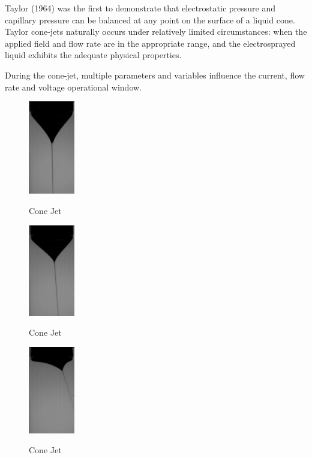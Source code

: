 Taylor (1964) was the first to demonstrate that electrostatic pressure and capillary pressure can be balanced at any point on the surface of a liquid cone.
Taylor cone-jets naturally occurs under relatively limited circumstances: when the applied field and flow rate are in the appropriate range, and the electrosprayed liquid exhibits the adequate physical properties.

During the cone-jet, multiple parameters and variables influence the current, flow rate and voltage operational window.

\begin{multicols}{3}

  \begin{figure}[H]
      \center
      \includegraphics[width=2cm]{Figuras/april/conjet1.png}
      \label{fig:conjt1}
      \caption{Cone Jet}
  \end{figure}


  \begin{figure}[H]
      \center
      \includegraphics[width=2cm]{Figuras/april/conjet2.png}
      \label{fig:conjt2}
      \caption{Cone Jet}
  \end{figure}


  \begin{figure}[H]
      \center
      \includegraphics[width=2cm]{Figuras/april/conjet3.png}
      \label{fig:conjt3}
      \caption{Cone Jet}
  \end{figure}

\end{multicols}

